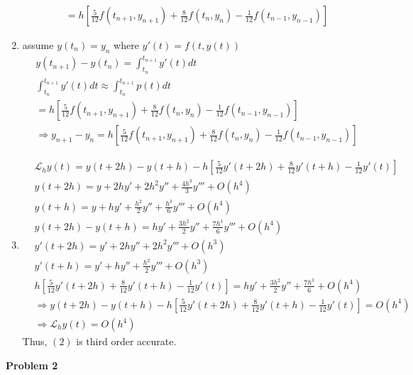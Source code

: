 \documentclass[10pt]{article}
\begin{document}
\begin{enumerate}[label=(\alph*)]
\begin{align*}
        &=h[\frac{5}{12}f(t_{n+1},y_{n+1})+\frac{8}{12}f(t_n,y_n)-\frac{1}{12}f(t_{n-1},y_{n-1})]
    \end{align*}
    \item assume $y(t_n)=y_n$ where $y'(t)=f(t,y(t))$
    \begin{align*}
        &y(t_{n+1})-y(t_{n})=\int_{t_n}^{t_{n+1}}y'(t)dt\\
        &\int_{t_n}^{t_{n+1}}y'(t)dt\approx \int_{t_n}^{t_{n+1}}p(t)dt\\
        &=h[\frac{5}{12}f(t_{n+1},y_{n+1})+\frac{8}{12}f(t_n,y_n)-\frac{1}{12}f(t_{n-1},y_{n-1})]\\
        &\Rightarrow y_{n+1}-y_n=h[\frac{5}{12}f(t_{n+1},y_{n+1})+\frac{8}{12}f(t_n,y_n)-\frac{1}{12}f(t_{n-1},y_{n-1})]
    \end{align*}
    \item \begin{align*}
        &\mathcal{L}_h y(t)=y(t+2h)-y(t+h)-h[\frac{5}{12}y'(t+2h)+\frac{8}{12}y'(t+h)-\frac{1}{12}y'(t)]\\
        &y(t+2h)=y+2hy'+2h^2y''+\frac{4h^3}{3}y'''+O(h^4)\\
        &y(t+h)=y+hy'+\frac{h^2}{2}y''+\frac{h^3}{6}y'''+O(h^4)\\
        &y(t+2h)-y(t+h)=hy'+\frac{3h^2}{2}y''+\frac{7h^3}{6}y'''+O(h^4)\\
        &y'(t+2h)=y'+2hy''+2h^2y'''+O(h^3)\\
        &y'(t+h)=y'+hy''+\frac{h^2}{2}y'''+O(h^3)\\
        &h[\frac{5}{12}y'(t+2h)+\frac{8}{12}y'(t+h)-\frac{1}{12}y'(t)]=hy'+\frac{3h^2}{2}y''+\frac{7h^3}{6}+O(h^4)\\
        &\Rightarrow y(t+2h)-y(t+h)-h[\frac{5}{12}y'(t+2h)+\frac{8}{12}y'(t+h)-\frac{1}{12}y'(t)]=O(h^4)\\
        &\Rightarrow \mathcal{L}_h y(t)=O(h^4)
    \end{align*}
    Thus, $(2)$ is third order accurate.
\end{enumerate}
\textbf{Problem 2}\\
\end{document}
